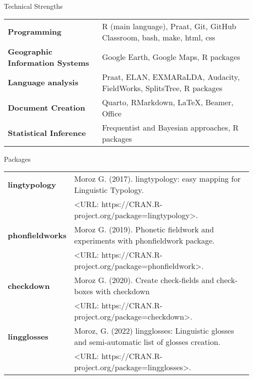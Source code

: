 \documentclass{resume} %
\begin{document}

\begin{rSection}{Technical Strengths}

\begin{tabular}{ @{} >{\bfseries}l @{\hspace{6ex}} l }
Programming & R (main language), Praat, Git, GitHub Classroom, bash, make, html, css\\
Geographic Information Systems & Google Earth, Google Maps, R packages\\
Language analysis & Praat, ELAN, EXMARaLDA, Audacity, FieldWorks, SplitsTree, R packages\\
Document Creation & Quarto, RMarkdown, \LaTeX, Beamer, Office\\
Statistical Inference & Frequentist and Bayesian approaches, R packages\\
\end{tabular}

\end{rSection}

\begin{rSection}{Packages}
\begin{tabular}{ @{} >{\bfseries}l @{\hspace{6ex}} l }
lingtypology  & Moroz G. (2017). lingtypology: easy mapping for Linguistic Typology. \\
& <URL: https://CRAN.R-project.org/package=lingtypology>.\\
phonfieldworks & Moroz G. (2019). Phonetic fieldwork and experiments with phonfieldwork
package.\\
& <URL: https://CRAN.R-project.org/package=phonfieldwork>.\\
checkdown & Moroz G. (2020). Create check-fields and check-boxes with checkdown\\
& <URL: https://CRAN.R-project.org/package=checkdown>.\\
lingglosses & Moroz, G. (2022) lingglosses: Linguistic glosses and semi-automatic list of glosses creation.\\
& <URL: https://CRAN.R-project.org/package=lingglosses>.\\
\end{tabular}

\end{rSection}
\end{document}
